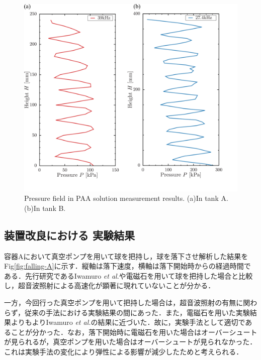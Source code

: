 \begin{figure}[ht]
    \centering
    \includegraphics[width=12cm,clip]{4-Results/press.png}
    \caption{Pressure field in PAA solution measurement results. (a)In tank A. (b)In tank B.}
    \label{fig:pressure}
\end{figure}

\newpage

\subsection{装置改良における 実験結果}

容器Aにおいて真空ポンプを用いて球を把持し，球を落下させ解析した結果をFig\ref{fig:falling-A}に示す．縦軸は落下速度，横軸は落下開始時からの経過時間である．先行研究であるIwamuro \textit{et al}.\cite{ref:8}や電磁石を用いて球を把持した場合と比較し，超音波照射による高速化が顕著に現れていないことが分かる．


一方，今回行った真空ポンプを用いて把持した場合は，超音波照射の有無に関わらず，従来の手法における実験結果の間にあった．また，電磁石を用いた実験結果よりもよりIwamuro \textit{et al.}\cite{ref:8}の結果に近づいた．故に，実験手法として適切であることが分かった．なお，落下開始時に電磁石を用いた場合はオーバーシュートが見られるが，真空ポンプを用いた場合はオーバーシュートが見られなかった．これは実験手法の変化により弾性による影響が減少したためと考えられる．

